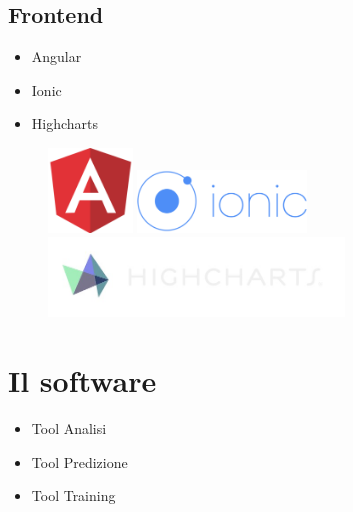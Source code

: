 \documentclass[xcolor=x11names,compress, 
]{beamer}
\theoremstyle{definition} \newtheorem{esempio}{Esempio}
\theoremstyle{definition}
\begin{document}
	\subsection{Frontend}
		\begin{frame}{\subsecname}
			\begin{itemize}
				\item Angular
				\item Ionic
				\item Highcharts 
			\end{itemize}
			\begin{figure}
				\includegraphics[width=0.2\textwidth]{immagini/angular}
				\includegraphics[width=0.4\textwidth]{immagini/ionic}
				\includegraphics[width=0.7\textwidth]{immagini/highcharts}
			\end{figure}
		\end{frame}


\section{Il software}
	\begin{frame}{\secname}
		\begin{itemize}
			\item Tool Analisi
			\item Tool Predizione
			\item Tool Training
		\end{itemize}
	\end{frame}
\end{document}
